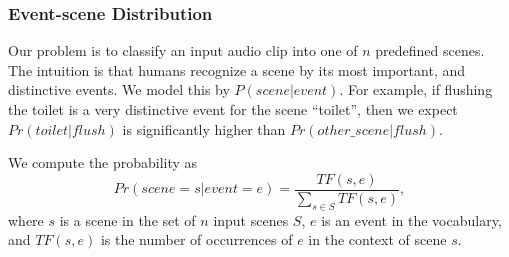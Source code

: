 %
%

\subsubsection{Event-scene Distribution}
Our problem is to classify an input audio clip into one of $n$ predefined
scenes. The intuition is that humans recognize a scene by its most important,
and distinctive events. We model this by $P(scene | event)$. For example, if
flushing the toilet is a very distinctive event for the scene ``toilet'', 
then we expect $Pr(toilet | flush)$ is significantly higher than 
$Pr(other\_scene | flush)$.

We compute the probability as
\begin{equation}
\label{eqn:prob}
Pr(scene=s | event=e)  = \frac{TF(s, e)}{\sum_{s \in S} TF(s, e)},
\end{equation}
where $s$ is a scene in the set of $n$ input scenes $S$, 
$e$ is an event in the vocabulary, and $TF(s, e)$ is the number of occurrences
of $e$ in the context of scene $s$.


